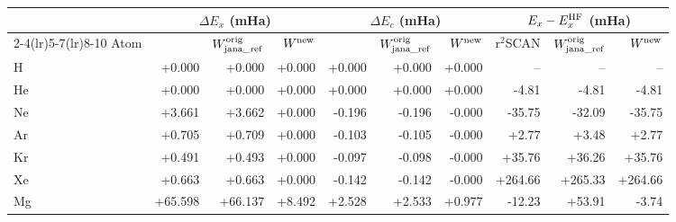 \begin{tabular}{@{}l rrr rrr rrr@{}}
\toprule
 & \multicolumn{3}{c}{$\Delta E_x$ (mHa)} & \multicolumn{3}{c}{$\Delta E_c$ (mHa)} & \multicolumn{3}{c}{$E_x-E_x^{\rm HF}$ (mHa)} \\
\cmidrule(lr){2-4}\cmidrule(lr){5-7}\cmidrule(lr){8-10}
Atom & \janaref{} & $W^{\rm orig}_{\rm jana\_ref}$ & $W^{\rm new}$ & \janaref{} & $W^{\rm orig}_{\rm jana\_ref}$ & $W^{\rm new}$ & r$^2$SCAN & $W^{\rm orig}_{\rm jana\_ref}$ & $W^{\rm new}$ \\
\midrule
H & +0.000 & \textcolor{pyscfred}{+0.000} & \textcolor{pyscfred}{+0.000} & +0.000 & \textcolor{pyscfred}{+0.000} & \textcolor{pyscfred}{+0.000} & -- & -- & -- \\
He & +0.000 & \textcolor{pyscfred}{+0.000} & \textcolor{pyscfred}{+0.000} & +0.000 & \textcolor{pyscfred}{+0.000} & \textcolor{pyscfred}{+0.000} & \textcolor{pyscfred}{-4.81} & \textcolor{pyscfred}{-4.81} & \textcolor{pyscfred}{-4.81} \\
Ne & +3.661 & \textcolor{pyscfred}{+3.662} & \textcolor{pyscfred}{+0.000} & -0.196 & \textcolor{pyscfred}{-0.196} & \textcolor{pyscfred}{-0.000} & \textcolor{pyscfred}{-35.75} & \textcolor{pyscfred}{-32.09} & \textcolor{pyscfred}{-35.75} \\
Ar & +0.705 & \textcolor{pyscfred}{+0.709} & \textcolor{pyscfred}{+0.000} & -0.103 & \textcolor{pyscfred}{-0.105} & \textcolor{pyscfred}{-0.000} & \textcolor{pyscfred}{+2.77} & \textcolor{pyscfred}{+3.48} & \textcolor{pyscfred}{+2.77} \\
Kr & +0.491 & \textcolor{pyscfred}{+0.493} & \textcolor{pyscfred}{+0.000} & -0.097 & \textcolor{pyscfred}{-0.098} & \textcolor{pyscfred}{-0.000} & \textcolor{pyscfred}{+35.76} & \textcolor{pyscfred}{+36.26} & \textcolor{pyscfred}{+35.76} \\
Xe & +0.663 & \textcolor{pyscfred}{+0.663} & \textcolor{pyscfred}{+0.000} & -0.142 & \textcolor{pyscfred}{-0.142} & \textcolor{pyscfred}{-0.000} & \textcolor{pyscfred}{+264.66} & \textcolor{pyscfred}{+265.33} & \textcolor{pyscfred}{+264.66} \\
Mg & +65.598 & \textcolor{pyscfred}{+66.137} & \textcolor{pyscfred}{+8.492} & +2.528 & \textcolor{pyscfred}{+2.533} & \textcolor{pyscfred}{+0.977} & \textcolor{pyscfred}{-12.23} & \textcolor{pyscfred}{+53.91} & \textcolor{pyscfred}{-3.74} \\
\bottomrule
\end{tabular}
